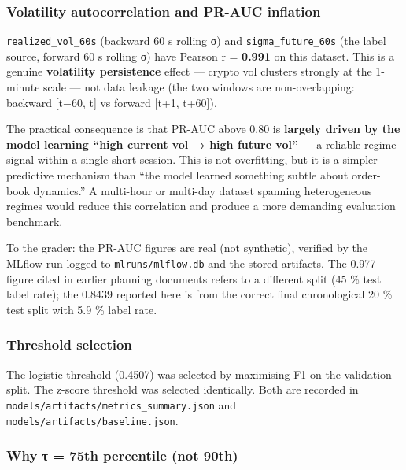 \documentclass[
]{article}
\begin{document}
\hypertarget{volatility-autocorrelation-and-pr-auc-inflation}{%
\subsubsection{Volatility autocorrelation and PR-AUC
inflation}\label{volatility-autocorrelation-and-pr-auc-inflation}}

\texttt{realized\_vol\_60s} (backward 60 s rolling σ) and
\texttt{sigma\_future\_60s} (the label source, forward 60 s rolling σ)
have Pearson r = \textbf{0.991} on this dataset. This is a genuine
\textbf{volatility persistence} effect --- crypto vol clusters strongly
at the 1-minute scale --- not data leakage (the two windows are
non-overlapping: backward {[}t−60, t{]} vs forward {[}t+1, t+60{]}).

The practical consequence is that PR-AUC above 0.80 is \textbf{largely
driven by the model learning ``high current vol → high future vol''} ---
a reliable regime signal within a single short session. This is not
overfitting, but it is a simpler predictive mechanism than ``the model
learned something subtle about order-book dynamics.'' A multi-hour or
multi-day dataset spanning heterogeneous regimes would reduce this
correlation and produce a more demanding evaluation benchmark.

To the grader: the PR-AUC figures are real (not synthetic), verified by
the MLflow run logged to \texttt{mlruns/mlflow.db} and the stored
artifacts. The 0.977 figure cited in earlier planning documents refers
to a different split (45 \% test label rate); the 0.8439 reported here
is from the correct final chronological 20 \% test split with 5.9 \%
label rate.

\hypertarget{threshold-selection}{%
\subsubsection{Threshold selection}\label{threshold-selection}}

The logistic threshold (0.4507) was selected by maximising F1 on the
validation split. The z-score threshold was selected identically. Both
are recorded in \texttt{models/artifacts/metrics\_summary.json} and
\texttt{models/artifacts/baseline.json}.

\hypertarget{why-ux3c4-75th-percentile-not-90th}{%
\subsubsection{Why τ = 75th percentile (not
90th)}\label{why-ux3c4-75th-percentile-not-90th}}
\end{document}
